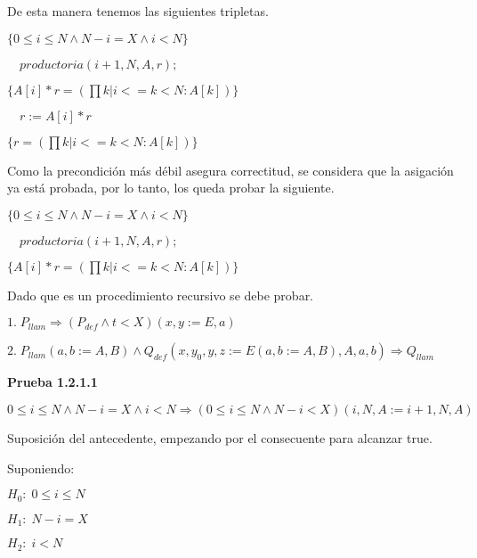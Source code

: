 \documentclass[hidelinks]{article}
\begin{document}
\begin{itemize}
	      De esta manera tenemos las siguientes tripletas.\par
	      $\{0 \leq i \leq N \land N - i = X \land i < N\}$\par
	      $\quad productoria(i + 1, N, A, r);$\par
	      $\{A[i]*r = (\prod k | i <= k < N: A[k])\}$\par
	      $\quad r := A[i] * r$\par
	      $\{r = (\prod k | i <= k < N: A[k])\} $\par

	      Como la precondición más débil asegura correctitud, se considera que la
	      asigación ya está probada, por lo tanto, los queda probar la siguiente.\par

	      $\{0 \leq i \leq N \land N - i = X \land i < N\}$\par
	      $\quad productoria(i + 1, N, A, r);$\par
	      $\{A[i]*r = (\prod k | i <= k < N: A[k])\}$\par

		  Dado que es un procedimiento recursivo se debe probar.\par
		  $1. \; P_{llam} \Rightarrow (P_{def} \land t < X)(x,y := E,a)$\par
		  $2. \; P_{llam}(a,b := A,B) \land Q_{def}(x,y_0,y,z := E(a,b := A,B), A, a,b) \Rightarrow Q_{llam}$\par

		  \textbf{Prueba 1.2.1.1}\par
		  $0 \leq i \leq N \land N - i = X \land i < N \Rightarrow (0 \leq i \leq N \land N - i < X)(i,N, A := i + 1,N,A)$\par

		  Suposición del antecedente, empezando por el consecuente para alcanzar true.\par

		  Suponiendo:\par
		  $H_0: \; 0 \leq i \leq N$\par
		  $H_1: \; N - i = X$\par
		  $H_2: \; i < N$\par


\end{itemize}
\end{document}

